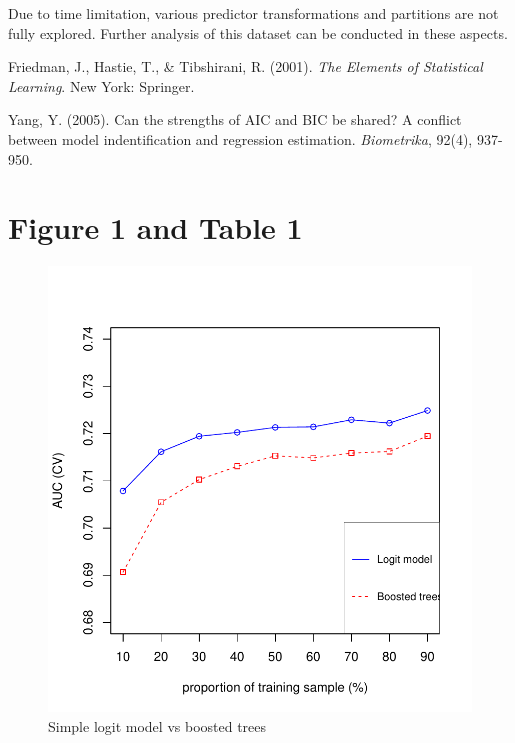 \documentclass[12pt]{amsart}
\theoremstyle{definition}
\theoremstyle{remark}
\numberwithin{equation}{section}
\begin{document}
Due to time limitation, various predictor transformations and partitions are not fully explored. Further analysis of this dataset can be conducted in these aspects. 




\begin{thebibliography}{10}

Friedman, J., Hastie, T., \& Tibshirani, R. (2001). \textit{The Elements of Statistical Learning}. New York: Springer.


Yang, Y. (2005). Can the strengths of AIC and BIC be shared? A conflict between model indentification and regression estimation. \textit{Biometrika}, 92(4), 937-950.


\end{thebibliography}

\newpage
\appendix

\section{Figure 1 and Table 1}

\begin{figure}[!h]
	\centering
	\includegraphics[scale=.6]{Rplot01.pdf}
	\caption{Simple logit model vs boosted trees} 
\end{figure}
\end{document}
